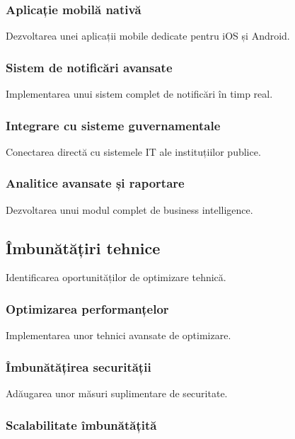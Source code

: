 \documentclass[12pt,a4paper]{report}
\begin{document}
\subsubsection{Aplicație mobilă nativă}

Dezvoltarea unei aplicații mobile dedicate pentru iOS și Android.

\subsubsection{Sistem de notificări avansate}

Implementarea unui sistem complet de notificări în timp real.

\subsubsection{Integrare cu sisteme guvernamentale}

Conectarea directă cu sistemele IT ale instituțiilor publice.

\subsubsection{Analitice avansate și raportare}

Dezvoltarea unui modul complet de business intelligence.

\subsection{Îmbunătățiri tehnice}

Identificarea oportunităților de optimizare tehnică.

\subsubsection{Optimizarea performanțelor}

Implementarea unor tehnici avansate de optimizare.

\subsubsection{Îmbunătățirea securității}

Adăugarea unor măsuri suplimentare de securitate.

\subsubsection{Scalabilitate îmbunătățită}
\end{document}
